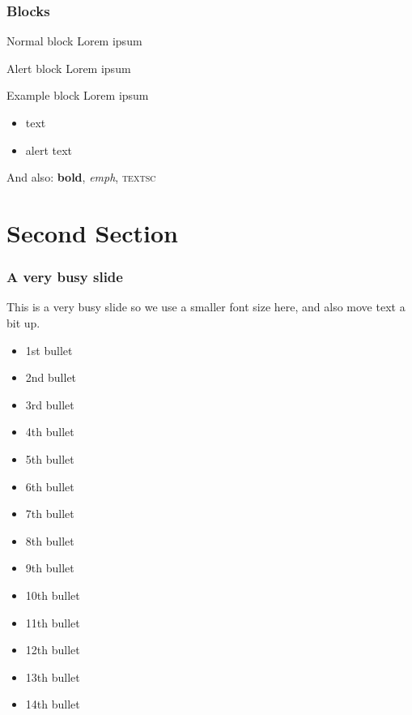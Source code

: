 \documentclass[t,10pt,aspectratio=169]{beamer}
\begin{document}
\begin{frame}
   \frametitle{Blocks}

   \begin{block}{Normal block}
      Lorem ipsum
   \end{block}

   \begin{alertblock}{Alert block}
      Lorem ipsum
   \end{alertblock}

   \begin{exampleblock}{Example block}
      Lorem ipsum
   \end{exampleblock}

   \begin{itemize}
      \item {} text
      \item \alert{alert} text
   \end{itemize}

   And also: \textbf{bold}, \emph{emph}, \textsc{textsc}

\end{frame}

\section{Second Section}

\begin{frame}
   \frametitle{A very busy slide}

   {
   \fontsize{8pt}{10}\selectfont

   \vspace{-2ex}

   This is a very busy slide so we use a smaller font size here, and also move text a bit up.

   \begin{itemize}
    \item 1st bullet
    \item 2nd bullet
    \item 3rd bullet
    \item 4th bullet
    \item 5th bullet
    \item 6th bullet
    \item 7th bullet
    \item 8th bullet
    \item 9th bullet
    \item 10th bullet
    \item 11th  bullet
    \item 12th bullet
    \item 13th bullet
    \item 14th bullet
   \end{itemize}

   }
\end{frame}
\end{document}
